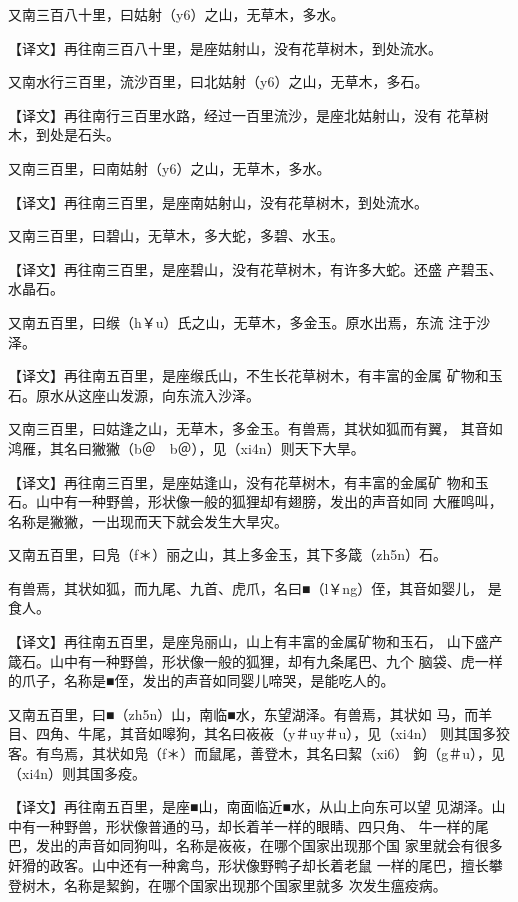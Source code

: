 \documentclass[a4paper,12pt,UTF8,twoside]{ctexbook}
\begin{document}
又南三百八十里，曰姑射（y6）之山，无草木，多水。

【译文】再往南三百八十里，是座姑射山，没有花草树木，到处流水。

又南水行三百里，流沙百里，曰北姑射（y6）之山，无草木，多石。

【译文】再往南行三百里水路，经过一百里流沙，是座北姑射山，没有 花草树木，到处是石头。

又南三百里，曰南姑射（y6）之山，无草木，多水。

【译文】再往南三百里，是座南姑射山，没有花草树木，到处流水。

又南三百里，曰碧山，无草木，多大蛇，多碧、水玉。

【译文】再往南三百里，是座碧山，没有花草树木，有许多大蛇。还盛 产碧玉、水晶石。

又南五百里，曰缑（h￥u）氏之山，无草木，多金玉。原水出焉，东流 注于沙泽。

【译文】再往南五百里，是座缑氏山，不生长花草树木，有丰富的金属 矿物和玉石。原水从这座山发源，向东流入沙泽。

又南三百里，曰姑逢之山，无草木，多金玉。有兽焉，其状如狐而有翼， 其音如鸿雁，其名曰獙獙（b＠　b＠），见（xi4n）则天下大旱。

【译文】再往南三百里，是座姑逢山，没有花草树木，有丰富的金属矿 物和玉石。山中有一种野兽，形状像一般的狐狸却有翅膀，发出的声音如同 大雁鸣叫，名称是獙獙，一出现而天下就会发生大旱灾。

又南五百里，曰凫（f＊）丽之山，其上多金玉，其下多箴（zh5n）石。

有兽焉，其状如狐，而九尾、九首、虎爪，名曰■（l￥ng）侄，其音如婴儿， 是食人。

【译文】再往南五百里，是座凫丽山，山上有丰富的金属矿物和玉石， 山下盛产箴石。山中有一种野兽，形状像一般的狐狸，却有九条尾巴、九个 脑袋、虎一样的爪子，名称是■侄，发出的声音如同婴儿啼哭，是能吃人的。

又南五百里，曰■（zh5n）山，南临■水，东望湖泽。有兽焉，其状如 马，而羊目、四角、牛尾，其音如嗥狗，其名曰峳峳（y＃uy＃u），见（xi4n） 则其国多狡客。有鸟焉，其状如凫（f＊）而鼠尾，善登木，其名曰絜（xi6） 鉤（g＃u），见（xi4n）则其国多疫。

【译文】再往南五百里，是座■山，南面临近■水，从山上向东可以望 见湖泽。山中有一种野兽，形状像普通的马，却长着羊一样的眼睛、四只角、 牛一样的尾巴，发出的声音如同狗叫，名称是峳峳，在哪个国家出现那个国 家里就会有很多奸猾的政客。山中还有一种禽鸟，形状像野鸭子却长着老鼠 一样的尾巴，擅长攀登树木，名称是絜鉤，在哪个国家出现那个国家里就多 次发生瘟疫病。
\end{document}
